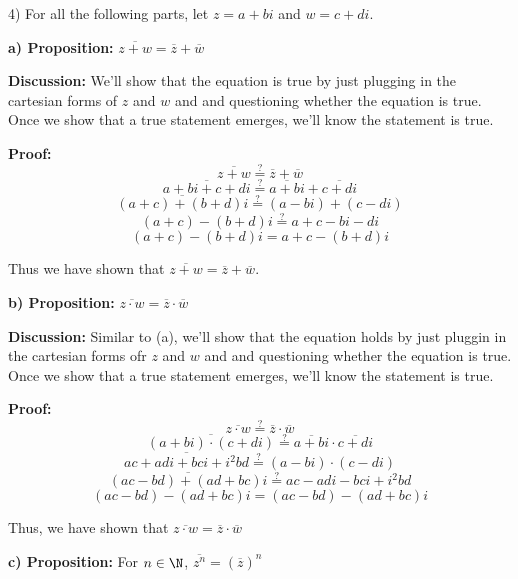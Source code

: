    \pagebreak

    \begin{paragraph}{4)} For all the following parts, let $z = a + bi$ and $w = c + di$.
        \spacing

        \textbf{a) Proposition:} $\overline{z + w} = \overline{z} + \overline{w}$
        \spacing

        \textbf{Discussion:} We'll show that the equation is true 
        by just plugging in the cartesian forms of $z$ and $w$ 
        and and questioning whether the 
        equation is true. Once we show that a true statement emerges, we'll know 
        the statement is true.
        \spacing

        \textbf{Proof:}
        $$\overline{z + w} \stackrel{?}{=} \overline{z} + \overline{w}$$
        $$\overline{a + bi + c + di} \stackrel{?}{=} \overline{a + bi} + \overline{c + di} $$
        $$\overline{(a + c) + (b + d)i} \stackrel{?}{=} (a - bi) + (c - di)$$
        $$(a + c) - (b + d)i \stackrel{?}{=} a + c - bi - di$$
        $$(a + c) - (b + d)i = a + c - (b + d)i$$
        \spacing

        Thus we have shown that $\overline{z + w} = \overline{z} + \overline{w}$.
        
        \proofEnd\bigskip

        \textbf{b) Proposition:} $\overline{z \cdot w} = \overline{z} \cdot \overline{w}$
        \spacing

        \textbf{Discussion:} Similar to (a), we'll show that the equation holds by just 
        pluggin in the cartesian forms ofr $z$ and $w$ and and questioning whether the 
        equation is true. Once we show that a true statement emerges, we'll know 
        the statement is true.
        \spacing
        
        \textbf{Proof:} 
        $$\overline{z \cdot w} \stackrel{?}{=} \overline{z} \cdot \overline{w}$$
        $$\overline{(a + bi) \cdot (c + di)} \stackrel{?}{=} \overline{a + bi} \cdot \overline{c + di}$$
        $$\overline{ac + adi + bci + i^2bd} \stackrel{?}{=} (a - bi) \cdot (c - di)$$
        $$\overline{(ac - bd) + (ad + bc)i} \stackrel{?}{=} ac - adi - bci + i^2bd$$
        $$(ac - bd) - (ad + bc)i = (ac - bd) - (ad + bc)i$$

        Thus, we have shown that $\overline{z \cdot w} = \overline{z} \cdot \overline{w}$\\
        \proofEnd\bigskip

        \textbf{c) Proposition:} For $n \in \N$, $\overline{z^n} = (\overline{z})^n$
        \spacing


\end{paragraph}

